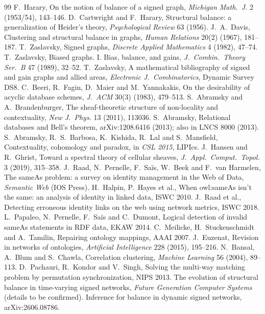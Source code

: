 \documentclass[11pt]{article}
\theoremstyle{plain}
\theoremstyle{definition}
\theoremstyle{remark}
\begin{document}
\begin{thebibliography}{99}
 F.~Harary, On the notion of balance of a signed graph, \emph{Michigan Math.\ J.} 2 (1953/54), 143--146.
 D.~Cartwright and F.~Harary, Structural balance: a generalization of Heider's theory, \emph{Psychological Review} 63 (1956).
 J.~A.~Davis, Clustering and structural balance in graphs, \emph{Human Relations} 20(2) (1967), 181--187.
 T.~Zaslavsky, Signed graphs, \emph{Discrete Applied Mathematics} 4 (1982), 47--74.
 T.~Zaslavsky, Biased graphs. I. Bias, balance, and gains, \emph{J.\ Combin.\ Theory Ser.\ B} 47 (1989), 32--52.
 T.~Zaslavsky, A mathematical bibliography of signed and gain graphs and allied areas, \emph{Electronic J.\ Combinatorics}, Dynamic Survey DS8.
 C.~Beeri, R.~Fagin, D.~Maier and M.~Yannakakis, On the desirability of acyclic database schemes, \emph{J.\ ACM} 30(3) (1983), 479--513.
 S.~Abramsky and A.~Brandenburger, The sheaf-theoretic structure of non-locality and contextuality, \emph{New J.\ Phys.} 13 (2011), 113036.
 S.~Abramsky, Relational databases and Bell's theorem, arXiv:1208.6416 (2013); also in LNCS 8000 (2013).
 S.~Abramsky, R.~S.~Barbosa, K.~Kishida, R.~Lal and S.~Mansfield, Contextuality, cohomology and paradox, in \emph{CSL 2015}, LIPIcs.
 J.~Hansen and R.~Ghrist, Toward a spectral theory of cellular sheaves, \emph{J.\ Appl.\ Comput.\ Topol.} 3 (2019), 315--358.
 J.~Raad, N.~Pernelle, F.~Sa\"{i}s, W.~Beek and F.~van Harmelen, The sameAs problem: a survey on identity management in the Web of Data, \emph{Semantic Web} (IOS Press).
 H.~Halpin, P.~Hayes et al., When owl:sameAs isn't the same: an analysis of identity in linked data, ISWC 2010.
 J.~Raad et al., Detecting erroneous identity links on the web using network metrics, ISWC 2018.
 L.~Papaleo, N.~Pernelle, F.~Sa\"{i}s and C.~Dumont, Logical detection of invalid sameAs statements in RDF data, EKAW 2014.
 C.~Meilicke, H.~Stuckenschmidt and A.~Tamilin, Repairing ontology mappings, AAAI 2007.
 J.~Euzenat, Revision in networks of ontologies, \emph{Artificial Intelligence} 228 (2015), 195--216.
 N.~Bansal, A.~Blum and S.~Chawla, Correlation clustering, \emph{Machine Learning} 56 (2004), 89--113.
 D.~Pachauri, R.~Kondor and V.~Singh, Solving the multi-way matching problem by permutation synchronization, NIPS 2013.
 The evolution of structural balance in time-varying signed networks, \emph{Future Generation Computer Systems} (details to be confirmed).
 Inference for balance in dynamic signed networks, arXiv:2606.08786.
\end{thebibliography}
\end{document}
